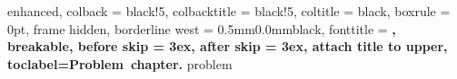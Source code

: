 \usepackage{titlesec}
\usepackage[many]{tcolorbox}

\titlespacing*{\chapter}{0cm}{-2.0cm}{0.50cm}
\titlespacing*{\section}{0cm}{0.50cm}{0.25cm}

\setlength{\parindent}{0pt}
\setlength{\parskip}{1ex}



%
{enhanced,
  colback = black!5, %
  colbacktitle = black!5,
  coltitle = black,
  boxrule = 0pt,
  frame hidden,
  borderline west = {0.5mm}{0.0mm}{black},
  fonttitle = \bfseries\sffamily,
  breakable,
  before skip = 3ex,
  after skip = 3ex,
  attach title to upper,
  toclabel={Problem~chapter.\thetcbcounter}
}{problem}

